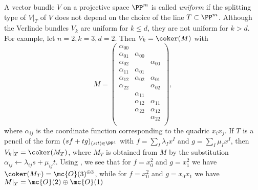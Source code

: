 \begin{example}
	A vector bundle $V$ on a projective space $\PP^m$ is called \emph{uniform} if the splitting type of $V|_T$ of $V$ does not depend on the choice of the line $T\subset \PP^m$. Although the Verlinde bundles $V_k$ are uniform for $k\leq d$, they are not uniform for $k>d$. For example, let $n=2,k=3,d=2$. Then $V_k = \coker(M)$ with
	\[
		M = \begin{pmatrix}
			\alpha_{00} & & \\
			\alpha_{01} & \alpha_{00} & \\
			\alpha_{02} & & \alpha_{00} \\
			\alpha_{11} & \alpha_{01} & \\
			\alpha_{12} & \alpha_{02} & \alpha_{01} \\
			\alpha_{22} & & \alpha_{02} \\
			& \alpha_{11} & \\
			& \alpha_{12} & \alpha_{11} \\
			& \alpha_{22} & \alpha_{12} \\
			& & \alpha_{22} \\ 
		\end{pmatrix}, 
	\]
	where $\alpha_{ij}$ is the coordinate function corresponding to the quadric $x_i x_j$. If $T$ is a pencil of the form $(sf + tg)_{(s:t)\in\PP^1}$ with $f=\sum_I \lambda_I x^I$ and $g = \sum_I \mu_I x^I$, then $V_k|_T = \coker(M_T)$, where $M_T$ is obtained from $M$ by the substitution $\alpha_{ij} \leftarrow \lambda_{ij} s + \mu_{ij} t$. Using , we see that for $f = x_0^2$ and $g=x_1^2$ we have $\coker(M_T) = \mc{O}(3)^{\oplus 3}$, while for $f=x_0^2$ and $g=x_0 x_1$ we have $M|_T = \mc{O}(2) \oplus \mc{O}(1)$
\end{example}

